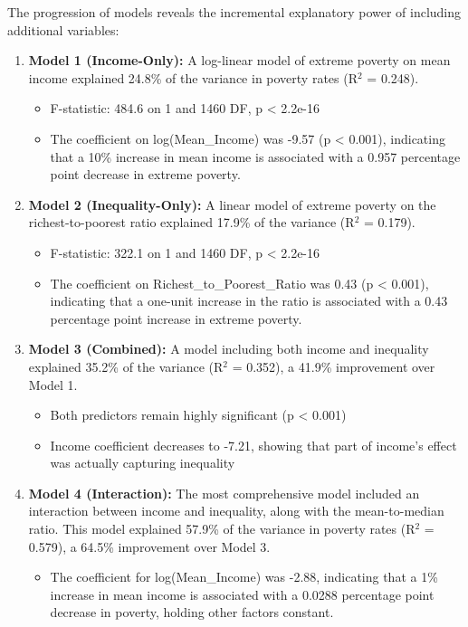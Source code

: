 \documentclass[12pt,a4paper]{article}
\begin{document}
The progression of models reveals the incremental explanatory power of including additional variables:
\begin{enumerate}
    \item \textbf{Model 1 (Income-Only):} A log-linear model of extreme poverty on mean income explained 24.8\% of the variance in poverty rates (R$^2$ = 0.248). 
    \begin{itemize}
        \item F-statistic: 484.6 on 1 and 1460 DF, p < 2.2e-16
        \item The coefficient on log(Mean\_Income) was -9.57 (p < 0.001), indicating that a 10\% increase in mean income is associated with a 0.957 percentage point decrease in extreme poverty.
    \end{itemize}
    \item \textbf{Model 2 (Inequality-Only):} A linear model of extreme poverty on the richest-to-poorest ratio explained 17.9\% of the variance (R$^2$ = 0.179). 
    \begin{itemize}
        \item F-statistic: 322.1 on 1 and 1460 DF, p < 2.2e-16
        \item The coefficient on Richest\_to\_Poorest\_Ratio was 0.43 (p < 0.001), indicating that a one-unit increase in the ratio is associated with a 0.43 percentage point increase in extreme poverty.
    \end{itemize}
    \item \textbf{Model 3 (Combined):} A model including both income and inequality explained 35.2\% of the variance (R$^2$ = 0.352), a 41.9\% improvement over Model 1. 
    \begin{itemize}
        \item Both predictors remain highly significant (p < 0.001)
        \item Income coefficient decreases to -7.21, showing that part of income's effect was actually capturing inequality
    \end{itemize}
    \item \textbf{Model 4 (Interaction):} The most comprehensive model included an interaction between income and inequality, along with the mean-to-median ratio. This model explained 57.9\% of the variance in poverty rates (R$^2$ = 0.579), a 64.5\% improvement over Model 3. 
    \begin{itemize}
        \item The coefficient for log(Mean\_Income) was -2.88, indicating that a 1\% increase in mean income is associated with a 0.0288 percentage point decrease in poverty, holding other factors constant.

\end{itemize}
\end{enumerate}
\end{document}
